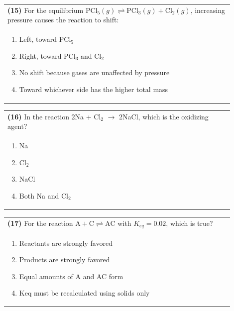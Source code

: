 \documentclass{article}
\begin{document}
\noindent\begin{tabular}{|p{0.9\linewidth}|}
\hline
\textbf{(15)} For the equilibrium $ \text{PCl}_5(g) \rightleftharpoons \text{PCl}_3(g) + \text{Cl}_2(g)$, increasing pressure causes the reaction to shift: \\[0.2cm]
\begin{minipage}[t]{0.85\linewidth}
\begin{enumerate}[label=\alph*.]
\item Left, toward PCl$_5$
\item Right, toward PCl$_3$ and Cl$_2$
\item No shift because gases are unaffected by pressure
\item Toward whichever side has the higher total mass
\end{enumerate}
\end{minipage}\\[0.2cm]
\hline
\end{tabular}


\noindent\begin{tabular}{|p{0.9\linewidth}|}
\hline
\textbf{(16)} In the reaction 2Na + Cl$_2$ $\rightarrow$ 2NaCl, which is the oxidizing agent?\\[0.2cm]
\begin{minipage}[t]{0.85\linewidth}
\begin{enumerate}[label=\alph*.]
\item Na
\item Cl$_2$
\item NaCl
\item Both Na and Cl$_2$
\end{enumerate}
\end{minipage}\\[0.2cm]
\hline
\end{tabular}
\newpage

\noindent\begin{tabular}{|p{0.9\linewidth}|}
\hline
\textbf{(17)} For the reaction $\text{A} + \text{C} \rightleftharpoons \text{AC}$ with $K_{eq} = 0.02$, which is true?\\[0.2cm]
\begin{minipage}[t]{0.85\linewidth}
\begin{enumerate}[label=\alph*.]
\item Reactants are strongly favored
\item Products are strongly favored
\item Equal amounts of A and AC form
\item Keq must be recalculated using solids only
\end{enumerate}
\end{minipage}\\[0.2cm]
\hline
\end{tabular}
\end{document}
